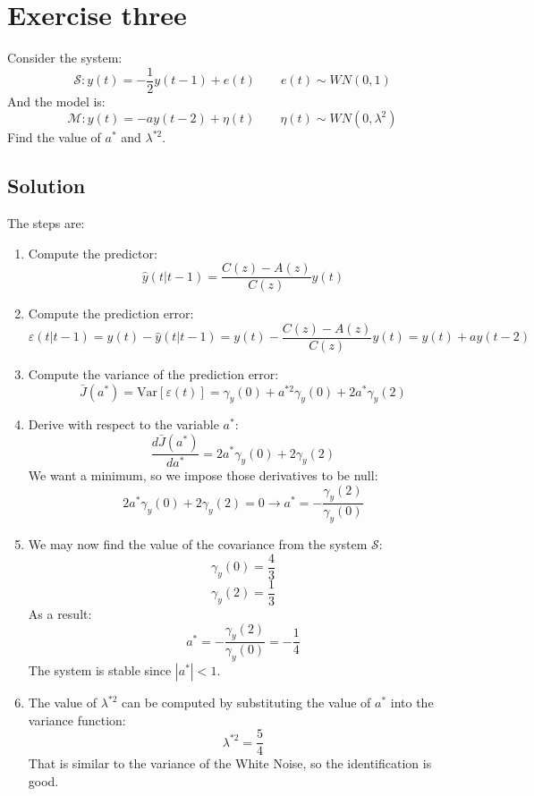 \section{Exercise three}

Consider the system: 
\[\mathcal{S}:y(t)=-\dfrac{1}{2}y(t-1)+e(t) \qquad e(t)\sim WN(0,1)\]
And the model is: 
\[\mathcal{M}:y(t)=-ay(t-2)+\eta(t) \qquad \eta(t)\sim WN(0,\lambda^2)\]
Find the value of $a^\ast$ and $\lambda^{\ast 2}$. 

\subsection*{Solution}
The steps are: 
\begin{enumerate}
    \item Compute the predictor: 
        \[\hat{y}(t|t-1)=\dfrac{C(z)-A(z)}{C(z)}y(t)\]
    \item Compute the prediction error: 
        \[\varepsilon(t|t-1)=y(t)-\hat{y}(t|t-1)=y(t)-\dfrac{C(z)-A(z)}{C(z)}y(t)=y(t)+ay(t-2)\]
    \item Compute the variance of the prediction error: 
        \[\bar{J}(a^\ast)=\text{Var}\left[\varepsilon(t)\right]=\gamma_y(0)+a^{\ast 2}\gamma_y(0)+2a^\ast \gamma_y(2)\]
    \item Derive with respect to the variable $a^\ast$: 
        \[\dfrac{d\bar{J}(a^\ast)}{d a^\ast}=2a^\ast\gamma_y(0)+2\gamma_y(2)\]
        We want a minimum, so we impose those derivatives to be null: 
        \[2a^\ast\gamma_y(0)+2\gamma_y(2)=0 \rightarrow a^\ast=-\dfrac{\gamma_y(2)}{\gamma_y(0)}\]
    \item We may now find the value of the covariance from the system $\mathcal{S}$: 
        \[\gamma_y(0)=\dfrac{4}{3}\]
        \[\gamma_y(2)=\dfrac{1}{3}\]
        As a result: 
        \[a^\ast=-\dfrac{\gamma_y(2)}{\gamma_y(0)}=-\dfrac{1}{4}\]
        The system is stable since $\left\lvert a^\ast \right\rvert<1$. 
    \item The value of $\lambda^{\ast 2}$ can be computed by substituting the value of $a^\ast$ into the variance function: 
        \[\lambda^{\ast 2}=\dfrac{5}{4}\]
        That is similar to the variance of the  White Noise, so the identification is good. 
\end{enumerate}
